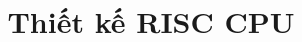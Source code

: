 \documentclass[twoside,final]{hcmut-report}
\title{Thiết kế RISC CPU}
\begin{document}
\coverpage

\tableofcontents
\listoffigures
\listoftables
\lstlistoflistings{}

\clearpage



\end{document}
